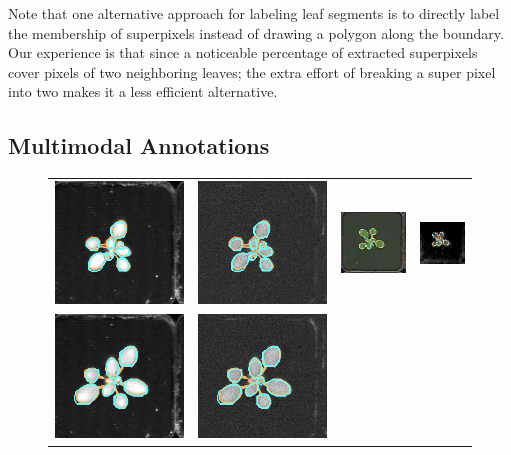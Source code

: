 Note that one alternative approach for labeling leaf segments is to directly label the membership of superpixels instead of drawing a polygon along the boundary.
Our experience is that since a noticeable percentage of extracted superpixels cover pixels of two neighboring leaves; the extra effort of breaking a super pixel into two makes it a less efficient alternative.


\subsection{Multimodal Annotations}
\begin{figure}[t]
\begin{centering}
\begin{tabular}{cccc}
\includegraphics[width=.15\textwidth]{Figures/LabelAlignment/day_3_hour_23-seg_ir.png}&
\includegraphics[width=.15\textwidth]{Figures/LabelAlignment/day_3_hour_23-seg_fmp.png}&
\includegraphics[width=.15\textwidth]{Figures/LabelAlignment/day_3_hour_23-seg_rgb.png}&
\includegraphics[width=.15\textwidth]{Figures/LabelAlignment/day_3_hour_23-seg_depth.png}\\
\includegraphics[width=.15\textwidth]{Figures/LabelAlignment/day_5_hour_23-seg_ir.png}&
\includegraphics[width=.15\textwidth]{Figures/LabelAlignment/day_5_hour_23-seg_fmp.png}&

\end{tabular}
\end{centering}
\end{figure}
